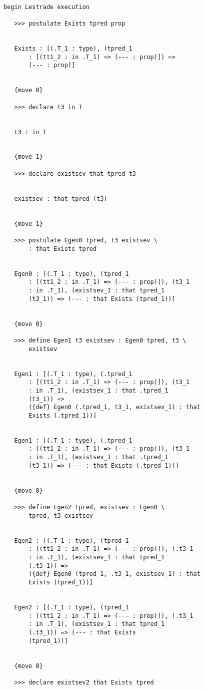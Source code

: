 \documentclass[12pt]{article}
\begin{document}
\begin{verbatim}

begin Lestrade execution

   >>> postulate Exists tpred prop


   Exists : [(.T_1 : type), (tpred_1 
       : [(tt1_2 : in .T_1) => (--- : prop)]) => 
       (--- : prop)]


   {move 0}

   >>> declare t3 in T


   t3 : in T


   {move 1}

   >>> declare existsev that tpred t3


   existsev : that tpred (t3)


   {move 1}

   >>> postulate Egen0 tpred, t3 existsev \
       : that Exists tpred


   Egen0 : [(.T_1 : type), (tpred_1 
       : [(tt1_2 : in .T_1) => (--- : prop)]), (t3_1 
       : in .T_1), (existsev_1 : that tpred_1 
       (t3_1)) => (--- : that Exists (tpred_1))]


   {move 0}

   >>> define Egen1 t3 existsev : Egen0 tpred, t3 \
       existsev


   Egen1 : [(.T_1 : type), (.tpred_1 
       : [(tt1_2 : in .T_1) => (--- : prop)]), (t3_1 
       : in .T_1), (existsev_1 : that .tpred_1 
       (t3_1)) => 
       ({def} Egen0 (.tpred_1, t3_1, existsev_1) : that 
       Exists (.tpred_1))]


   Egen1 : [(.T_1 : type), (.tpred_1 
       : [(tt1_2 : in .T_1) => (--- : prop)]), (t3_1 
       : in .T_1), (existsev_1 : that .tpred_1 
       (t3_1)) => (--- : that Exists (.tpred_1))]


   {move 0}

   >>> define Egen2 tpred, existsev : Egen0 \
       tpred, t3 existsev


   Egen2 : [(.T_1 : type), (tpred_1 
       : [(tt1_2 : in .T_1) => (--- : prop)]), (.t3_1 
       : in .T_1), (existsev_1 : that tpred_1 
       (.t3_1)) => 
       ({def} Egen0 (tpred_1, .t3_1, existsev_1) : that 
       Exists (tpred_1))]


   Egen2 : [(.T_1 : type), (tpred_1 
       : [(tt1_2 : in .T_1) => (--- : prop)]), (.t3_1 
       : in .T_1), (existsev_1 : that tpred_1 
       (.t3_1)) => (--- : that Exists 
       (tpred_1))]


   {move 0}

   >>> declare existsev2 that Exists tpred



\end{verbatim}
\end{document}

